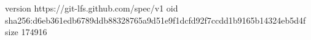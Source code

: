 version https://git-lfs.github.com/spec/v1
oid sha256:d6eb361edb6789ddb88328765a9d51e9f1dcfd92f7ccdd1b9165b14324eb5d4f
size 174916
